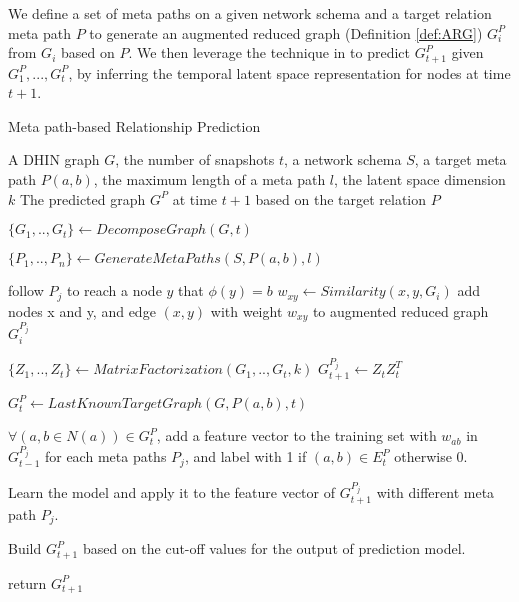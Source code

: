 We define a set of meta paths \cite{sun2011pathsim} on a given network schema and a target relation meta path $P$ to generate an augmented reduced graph (Definition \ref{def:ARG}) $G^P_i$ from $G_i$ based on $P$.  We then leverage the technique in \cite{Zhu2016} to predict $G^P_{t+1}$ given $G^P_1, ..., G^P_t$, by inferring the temporal latent space representation for nodes at time $t+1$.


\begin{algorithm}[t]
\caption{Meta path-based Relationship Prediction}\label{alg2}
\begin{algorithmic}[1]\scriptsize
\REQUIRE A DHIN graph $G$, the number of snapshots $t$, a network schema $S$, a target meta path $P(a,b)$, the maximum length of a meta path $l$, the latent space dimension $k$
\ENSURE The predicted graph $G^{P}$ at time $t+1$ based on the target relation $P$

\STATE $\{G_1, .., G_t\} \leftarrow DecomposeGraph(G, t)$

\STATE $\{P_1, .., P_n\} \leftarrow GenerateMetaPaths(S, P(a,b), l)$


    
        \STATE follow $P_j$ to reach a node $y$ that $\phi(y)=b$%
        \STATE $w_{xy} \leftarrow Similarity(x,y, G_i)$
        \STATE add nodes x and y, and edge $(x,y)$ with weight $w_{xy}$ to augmented reduced graph $G_i^{P_j}$ 
\ENDFOR

\ENDFOR

\STATE $\{Z_1, .., Z_t\} \leftarrow MatrixFactorization(G_1, .., G_t, k)$
\STATE $G^{P_j}_{t+1} \leftarrow Z_tZ^T_t$ 

\ENDFOR

\STATE $G^{P}_{t} \leftarrow LastKnownTargetGraph(G, P(a,b), t)$


\STATE $\forall (a,b\in N(a)) \in G^{P}_{t}$, add a feature vector to the training set with $w_{ab}$ in $G^{P_j}_{t-1}$ for each meta paths $P_j$, and label with 1 if $(a,b) \in E^{P}_{t}$ otherwise 0.

\STATE Learn the model and apply it to the feature vector of $G^{P_j}_{t+1}$ with different meta path $P_j$.

\STATE Build $G^{P}_{t+1}$ based on the cut-off values for the output of prediction model.

\STATE return $G^{P}_{t+1}$
\end{algorithmic}
\end{algorithm}


